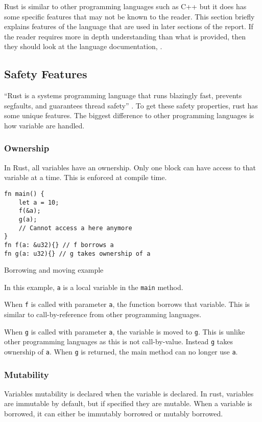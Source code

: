 \label{sec:rust-language-features}
Rust is similar to other programming languages such as C++ but it does has some specific features that may not be known to the reader. This section briefly explains features of the language that are used in later sections of the report. If the reader requires more in depth understanding than what is provided, then they should look at the language documentation, \textcite{rustbook}.

\subsection{Safety Features}
``Rust is a systems programming language that runs blazingly fast, prevents segfaults, and guarantees thread safety'' \parencite{rustlang}. To get these safety properties, rust has some unique features. The biggest difference to other programming languages is how variable are handled.

\subsubsection{Ownership}
In Rust, all variables have an ownership. Only one block can have access to that variable at a time. This is enforced at compile time.

\begin{code}
\begin{verbatim}
fn main() {
    let a = 10;
    f(&a);
    g(a);
    // Cannot access a here anymore
}
fn f(a: &u32){} // f borrows a
fn g(a: u32){} // g takes ownership of a
\end{verbatim}
\caption{Borrowing and moving example}
\end{code}

In this example, \texttt{a} is a local variable in the \texttt{main} method.

When \texttt{f} is called with parameter \texttt{a}, the function borrows that variable. This is similar to call-by-reference from other programming languages.

When \texttt{g} is called with parameter \texttt{a}, the variable is moved to \texttt{g}. This is unlike other programming languages as this is not call-by-value. Instead \texttt{g} takes ownership of \texttt{a}. When \texttt{g} is returned, the main method can no longer use \texttt{a}.

\subsubsection{Mutability}
Variables mutability is declared when the variable is declared. In rust, variables are immutable by default, but if specified they are mutable. When a variable is borrowed, it can either be immutably borrowed or mutably borrowed.


